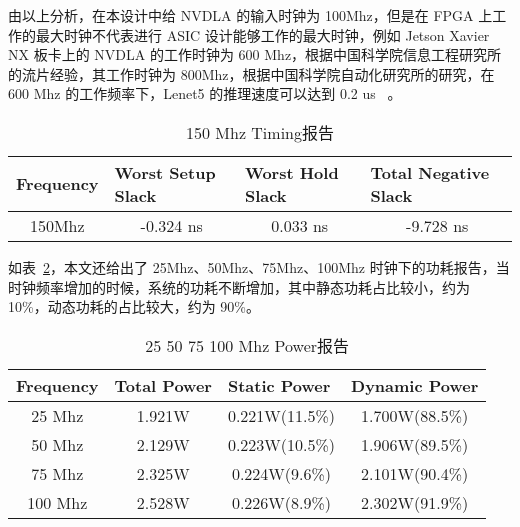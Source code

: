 由以上分析，在本设计中给 NVDLA 的输入时钟为 100Mhz，但是在 FPGA 上工作的最大时钟不代表进行 ASIC 设计能够工作的最大时钟，例如 Jetson Xavier NX 板卡上的 NVDLA 的工作时钟为 600 Mhz，根据中国科学院信息工程研究所的流片经验，其工作时钟为 800Mhz，根据中国科学院自动化研究所的研究，在 600 Mhz 的工作频率下，Lenet5 的推理速度可以达到 0.2 us ~\cite{inproceedings}。

\begin{table}[!htbp]
    \caption{150 Mhz Timing报告}
    \label{tab:150 Mhz Timing}
    \centering
    \footnotesize%
    \setlength{\tabcolsep}{4pt}%
    \renewcommand{\arraystretch}{1.2}%
    \begin{tabular}{llll}
        \toprule
        \textbf{Frequency}         & \textbf{Worst Setup Slack}    & \textbf{Worst Hold Slack}    & \textbf{Total Negative Slack} \\
        \midrule
        \multicolumn{1}{c}{150Mhz} & \multicolumn{1}{c}{-0.324 ns} & \multicolumn{1}{c}{0.033 ns} & \multicolumn{1}{c}{-9.728 ns} \\
        \bottomrule                   
    \end{tabular}
\end{table}

如表~\ref{tab:25-100 Mhz Power}，本文还给出了 25Mhz、50Mhz、75Mhz、100Mhz 时钟下的功耗报告，当时钟频率增加的时候，系统的功耗不断增加，其中静态功耗占比较小，约为 10\%，动态功耗的占比较大，约为 90\%。

\begin{table}[!htbp]
    \caption{25 50 75 100 Mhz Power报告}
    \label{tab:25-100 Mhz Power}
    \centering
    \footnotesize%
    \setlength{\tabcolsep}{4pt}%
    \renewcommand{\arraystretch}{1.2}%
    \begin{tabular}{cccc}
        \toprule
        \multicolumn{1}{l}{\textbf{Frequency}} & \multicolumn{1}{l}{\textbf{Total Power}} & \multicolumn{1}{l}{\textbf{Static Power}} & \multicolumn{1}{l}{\textbf{Dynamic Power}} \\
        \midrule
        25 Mhz                                 & 1.921W                                   & 0.221W(11.5\%)                            & 1.700W(88.5\%)                             \\
        50 Mhz                                 & 2.129W                                   & 0.223W(10.5\%)                            & 1.906W(89.5\%)                             \\
        75 Mhz                                 & 2.325W                                   & 0.224W(9.6\%)                             & 2.101W(90.4\%)                             \\
        100 Mhz                                & 2.528W                                   & 0.226W(8.9\%)                             & 2.302W(91.9\%)                             \\
        \bottomrule                   
    \end{tabular}
\end{table}

